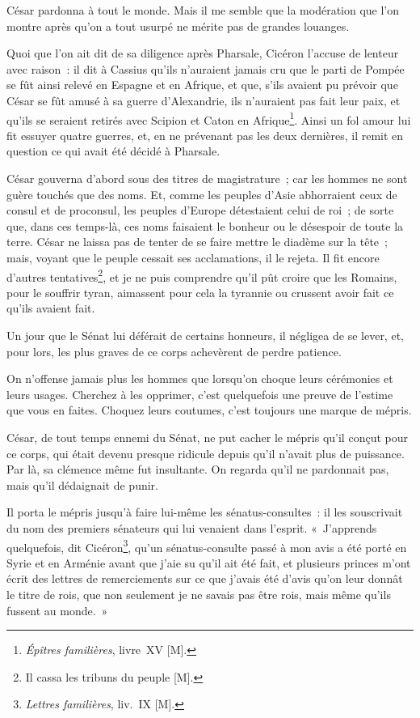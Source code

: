 \documentclass[french,twoside]{book} %
\begin{document}
César pardonna à tout le monde. Mais il me semble que la modération que l’on montre après qu’on a tout usurpé ne mérite pas de grandes louanges.\par
Quoi que l’on ait dit de sa diligence après Pharsale, Cicéron l’accuse de lenteur avec raison : il dit à Cassius qu’ils n’auraient jamais cru que le parti de Pompée se fût ainsi relevé en Espagne et en Afrique, et que, s’ils avaient pu prévoir que César se fût amusé à sa guerre d’Alexandrie, ils n’auraient pas fait leur paix, et qu’ils se seraient retirés avec Scipion et Caton en Afrique\footnote{{\itshape Épîtres familières}, livre XV [M].}. Ainsi un fol amour lui fit essuyer quatre guerres, et, en ne prévenant pas les deux dernières, il remit en question ce qui avait été décidé à Pharsale.\par
César gouverna d’abord sous des titres de magistrature ; car les hommes ne sont guère touchés que des noms. Et, comme les peuples d’Asie abhorraient ceux de consul et de proconsul, les peuples d’Europe détestaient celui de roi ; de sorte que, dans ces temps-là, ces noms faisaient le bonheur ou le désespoir de toute la terre. César ne laissa pas de tenter de se faire mettre le diadème sur la tête ; mais, voyant que le peuple cessait ses acclamations, il le rejeta. Il fit encore d’autres tentatives\footnote{Il cassa les tribuns du peuple [M].}, et je ne puis comprendre qu’il pût croire que les Romains, pour le souffrir tyran, aimassent pour cela la tyrannie ou crussent avoir fait ce qu’ils avaient fait.\par
Un jour que le Sénat lui déférait de certains honneurs, il négligea de se lever, et, pour lors, les plus graves de ce corps achevèrent de perdre patience.\par
On n’offense jamais plus les hommes que lorsqu’on choque leurs cérémonies et leurs usages. Cherchez à les opprimer, c’est quelquefois une preuve de l’estime que vous en faites. Choquez leurs coutumes, c’est toujours une marque de mépris.\par
César, de tout temps ennemi du Sénat, ne put cacher le mépris qu’il conçut pour ce corps, qui était devenu presque ridicule depuis qu’il n’avait plus de puissance. Par là, sa clémence même fut insultante. On regarda qu’il ne pardonnait pas, mais qu’il dédaignait de punir.\par
Il porta le mépris jusqu’à faire lui-même les sénatus-consultes : il les souscrivait du nom des premiers sénateurs qui lui venaient dans l’esprit. « J’apprends quelquefois, dit Cicéron\footnote{{\itshape Lettres familières}, liv. IX [M].}, qu’un sénatus-consulte passé à mon avis a été porté en Syrie et en Arménie avant que j’aie su qu’il ait été fait, et plusieurs princes m’ont écrit des lettres de remerciements sur ce que j’avais été d’avis qu’on leur donnât le titre de rois, que non seulement je ne savais pas être rois, mais même qu’ils fussent au monde. »\par
\end{document}
